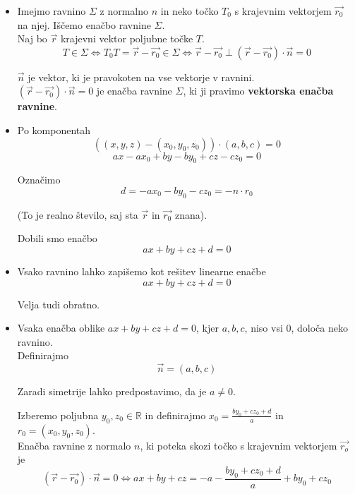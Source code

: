 \documentclass[a4paper,12pt]{article}
\begin{document}
\begin{itemize}
\item Imejmo ravnino $\Sigma$ z normalno $n$ in neko točko $T_0$ s krajevnim vektorjem $\vec{r_0}$ na njej. Iščemo enačbo ravnine $\Sigma$. \\

Naj bo $\vec{r}$ krajevni vektor poljubne točke $T$. 
$$ T \in \Sigma \Leftrightarrow T_0 T = \vec{r} - \vec{r_0} \in \Sigma \Leftrightarrow \vec{r} - \vec{r_0} \perp (\vec{r} - \vec{r_0}) \cdot \vec{n} = 0 $$

$\vec{n}$ je vektor, ki je pravokoten na vse vektorje v ravnini. \\

$ (\vec{r} - \vec{r_0}) \cdot \vec{n} = 0 $ je enačba ravnine $\Sigma$, ki ji pravimo \textbf{vektorska enačba ravnine}. \\

\item Po komponentah 
$$((x,y,z) - (x_0, y_0, z_0)) \cdot (a,b,c) = 0 $$
$$ ax - a x_0 + by - b y_0 + cz - c z_0 = 0 $$

Označimo
$$ d = - a x_0 - b y_0 - c z_0 = - n \cdot r_0 $$

\begin{center}
(To je realno število, saj sta $\vec{r}$ in  $\vec{r_0}$ znana).
\end{center}

Dobili smo enačbo $$ax + by + cz + d = 0$$

\item Vsako ravnino lahko zapišemo kot rešitev linearne enačbe $$ax +by+cz+d=0$$

Velja tudi obratno. \\

\item Vsaka enačba oblike $ax+by+cz+d=0$, kjer $a,b,c$, niso vsi 0, določa neko ravnino. \\

Definirajmo $$\vec{n}=(a,b,c)$$

Zaradi simetrije lahko predpostavimo, da je $a\neq0$. 

Izberemo poljubna $y_0, z_0 \in \mathbb{R} $ in definirajmo $x_0 = \frac{b y_0 + c z_0 + d}{a} $ in $ r_0 = (x_0, y_0, z_0)$. \\

Enačba ravnine z normalo $n$, ki poteka skozi točko s krajevnim vektorjem $\vec{r_o}$ je $$ (\vec{r} - \vec{r_0})\cdot \vec{n} =0 \Leftrightarrow ax+by+cz=-a- \frac{b y_0 + c z_0 + d}{a} + b y_0 + cz_0 $$


\end{itemize}
\end{document}
